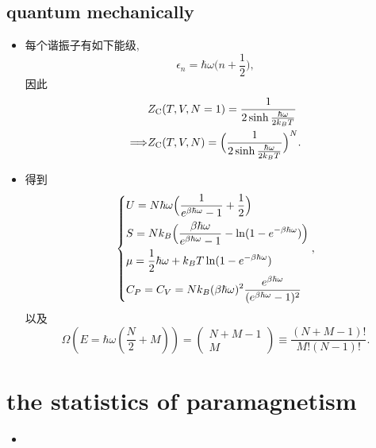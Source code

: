 \subsection{quantum mechanically}
\begin{itemize}
	\item 每个谐振子有如下能级,
	\begin{equation}
		\epsilon_n = \hbar \omega \Big( n + \frac{1}{2} \Big),
	\end{equation}
	因此
	\begin{align}
		& Z_\text{C}(T, V, N = 1) = \frac{1}{2 \sinh \frac{\hbar \omega}{2 k_B T}} \notag \\
		\Longrightarrow & Z_\text{C}(T, V, N) = \Big( \frac{1}{2 \sinh \frac{\hbar \omega}{2 k_B T}} \Big)^N.
	\end{align}
	
	\item 得到
	\begin{equation}
		\begin{dcases}
			U = N \hbar \omega \Big( \frac{1}{e^{\beta \hbar \omega} - 1} + \frac{1}{2} \Big) \\
			S = N k_B \Big( \frac{\beta \hbar \omega}{e^{\beta \hbar \omega} - 1} - \ln(1 - e^{- \beta \hbar \omega}) \Big) \\
			\mu = \frac{1}{2} \hbar \omega + k_B T \ln(1 - e^{- \beta \hbar \omega}) \\
			C_P = C_V = N k_B (\beta \hbar \omega)^2 \frac{e^{\beta \hbar \omega}}{(e^{\beta \hbar \omega} - 1)^2}
		\end{dcases},
	\end{equation}
	以及
	\begin{equation}
		\Omega(E = \hbar \omega ({\textstyle \frac{N}{2}} + M)) = \begin{pmatrix}
			N + M - 1 \\
			M
		\end{pmatrix} \equiv \frac{(N + M - 1)!}{M! (N - 1)!}.
	\end{equation}
\end{itemize}

\section{the statistics of paramagnetism}
\begin{itemize}
	\item 
\end{itemize}

